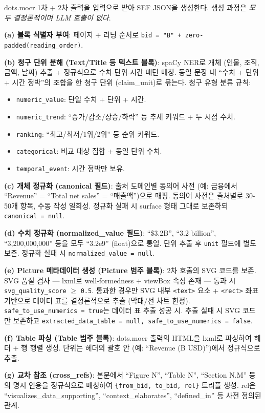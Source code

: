 \documentclass[11pt]{article}
\begin{document}
dots.mocr 1차 + 2차 출력을 입력으로 받아 SEF JSON을 생성한다. 생성 과정은 \emph{모두 결정론적이며 LLM 호출이 없다}.

\textbf{(a) 블록 식별자 부여}: 페이지 + 리딩 순서로 \texttt{bid = "B" + zero-padded(reading\_order)}.

\textbf{(b) 청구 단위 분해 (Text/Title 등 텍스트 블록)}: spaCy NER로 개체 (인물, 조직, 금액, 날짜) 추출 + 정규식으로 수치-단위-시간 패턴 매칭. 동일 문장 내 ``수치 + 단위 + 시간 정박''의 조합을 한 청구 단위 (claim\_unit)로 묶는다. 청구 유형 분류 규칙:
\begin{itemize}[leftmargin=*]
    \item \texttt{numeric\_value}: 단일 수치 + 단위 + 시간.
    \item \texttt{numeric\_trend}: ``증가/감소/상승/하락'' 등 추세 키워드 + 두 시점 수치.
    \item \texttt{ranking}: ``최고/최저/1위/2위'' 등 순위 키워드.
    \item \texttt{categorical}: 비교 대상 집합 + 동일 단위 수치.
    \item \texttt{temporal\_event}: 시간 정박만 보유.
\end{itemize}

\textbf{(c) 개체 정규화 (canonical 필드)}: 출처 도메인별 동의어 사전 (예: 금융에서 ``Revenue'' = ``Total net sales'' = ``매출액'')으로 매핑. 동의어 사전은 출처별로 30-50개 항목, 수동 작성 일회성. 정규화 실패 시 surface 형태 그대로 보존하되 \texttt{canonical = null}.

\textbf{(d) 수치 정규화 (normalized\_value 필드)}: ``\$3.2B'', ``3.2 billion'', ``3,200,000,000'' 등을 모두 ``3.2e9'' (float)으로 통일. 단위 추출 후 \texttt{unit} 필드에 별도 보존. 정규화 실패 시 \texttt{normalized\_value = null}.

\textbf{(e) Picture 메타데이터 생성 (Picture 범주 블록)}: 2차 호출의 SVG 코드를 보존. SVG 품질 검사 — lxml로 well-formedness + viewBox 속성 존재 — 통과 시 \texttt{svg\_quality\_score} $\geq$ \texttt{0.5}. 통과한 경우만 SVG 내부 \texttt{<text>} 요소 + \texttt{<rect>} 좌표 기반으로 데이터 표를 결정론적으로 추출 (막대/선 차트 한정). \texttt{safe\_to\_use\_numerics = true}는 데이터 표 추출 성공 시. 추출 실패 시 SVG 코드만 보존하고 \texttt{extracted\_data\_table = null, safe\_to\_use\_numerics = false}.

\textbf{(f) Table 파싱 (Table 범주 블록)}: dots.mocr 출력의 HTML을 lxml로 파싱하여 헤더 + 행 행렬 생성. 단위는 헤더의 괄호 안 (예: ``Revenue (B USD)'')에서 정규식으로 추출.

\textbf{(g) 교차 참조 (cross\_refs)}: 본문에서 ``Figure N'', ``Table N'', ``Section N.M'' 등의 명시 인용을 정규식으로 매칭하여 \texttt{\{from\_bid, to\_bid, rel\}} 트리플 생성. rel은 ``visualizes\_data\_supporting'', ``context\_elaborates'', ``defined\_in'' 등 사전 정의된 관계.
\end{document}
